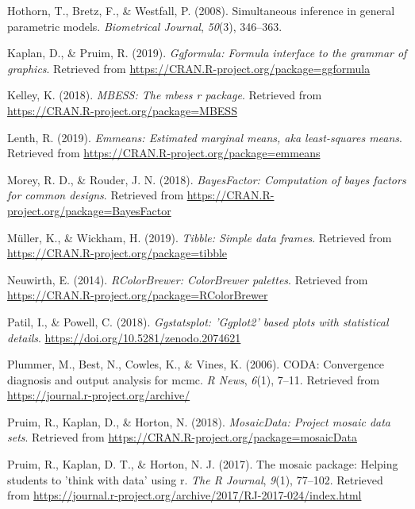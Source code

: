 \documentclass[man]{apa6}
\begin{document}
\leavevmode\hypertarget{ref-R-multcomp}{}%
Hothorn, T., Bretz, F., \& Westfall, P. (2008). Simultaneous inference in general parametric models. \emph{Biometrical Journal}, \emph{50}(3), 346--363.

\leavevmode\hypertarget{ref-R-ggformula}{}%
Kaplan, D., \& Pruim, R. (2019). \emph{Ggformula: Formula interface to the grammar of graphics}. Retrieved from \url{https://CRAN.R-project.org/package=ggformula}

\leavevmode\hypertarget{ref-R-MBESS}{}%
Kelley, K. (2018). \emph{MBESS: The mbess r package}. Retrieved from \url{https://CRAN.R-project.org/package=MBESS}

\leavevmode\hypertarget{ref-R-emmeans}{}%
Lenth, R. (2019). \emph{Emmeans: Estimated marginal means, aka least-squares means}. Retrieved from \url{https://CRAN.R-project.org/package=emmeans}

\leavevmode\hypertarget{ref-R-BayesFactor}{}%
Morey, R. D., \& Rouder, J. N. (2018). \emph{BayesFactor: Computation of bayes factors for common designs}. Retrieved from \url{https://CRAN.R-project.org/package=BayesFactor}

\leavevmode\hypertarget{ref-R-tibble}{}%
Müller, K., \& Wickham, H. (2019). \emph{Tibble: Simple data frames}. Retrieved from \url{https://CRAN.R-project.org/package=tibble}

\leavevmode\hypertarget{ref-R-RColorBrewer}{}%
Neuwirth, E. (2014). \emph{RColorBrewer: ColorBrewer palettes}. Retrieved from \url{https://CRAN.R-project.org/package=RColorBrewer}

\leavevmode\hypertarget{ref-R-ggstatsplot}{}%
Patil, I., \& Powell, C. (2018). \emph{Ggstatsplot: 'Ggplot2' based plots with statistical details}. \url{https://doi.org/10.5281/zenodo.2074621}

\leavevmode\hypertarget{ref-R-coda}{}%
Plummer, M., Best, N., Cowles, K., \& Vines, K. (2006). CODA: Convergence diagnosis and output analysis for mcmc. \emph{R News}, \emph{6}(1), 7--11. Retrieved from \url{https://journal.r-project.org/archive/}

\leavevmode\hypertarget{ref-R-mosaicData}{}%
Pruim, R., Kaplan, D., \& Horton, N. (2018). \emph{MosaicData: Project mosaic data sets}. Retrieved from \url{https://CRAN.R-project.org/package=mosaicData}

\leavevmode\hypertarget{ref-R-mosaic}{}%
Pruim, R., Kaplan, D. T., \& Horton, N. J. (2017). The mosaic package: Helping students to 'think with data' using r. \emph{The R Journal}, \emph{9}(1), 77--102. Retrieved from \url{https://journal.r-project.org/archive/2017/RJ-2017-024/index.html}
\end{document}
